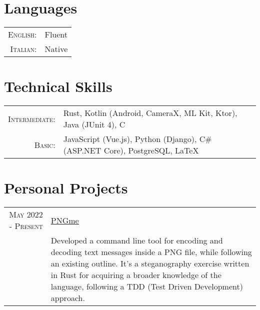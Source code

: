 \documentclass[a4paper,10pt]{article} %
\begin{document}

\section{Languages}

\begin{tabular}{rl}
\textsc{English:} & Fluent\\
\textsc{Italian:} & Native\\
\end{tabular}


\section{Technical Skills}

\begin{tabular}{rl}
\textsc{Intermediate:} & Rust, Kotlin \footnotesize(Android, CameraX, ML Kit, Ktor)\normalsize, Java \footnotesize(JUnit 4)\normalsize, C\\
\textsc{Basic:} & JavaScript \footnotesize(Vue.js)\normalsize, Python \footnotesize(Django)\normalsize, C\# \footnotesize(ASP.NET Core)\normalsize, PostgreSQL, {\sffamily\LaTeX}\setmainfont[SmallCapsFont=Fontin SmallCaps]{Fontin-Regular}\\
\end{tabular}


\section{Personal Projects}

\begin{tabular}{r|p{10.5cm}}
\textsc{May 2022 - Present} & \href{https://github.com/rdxdkr/my-PNGme}{\underline{PNGme}} \emph{}\\ & \footnotesize{Developed a command line tool for encoding and decoding text messages inside a PNG file, while following an existing outline. It's a steganography exercise written in Rust for acquiring a broader knowledge of the language, following a TDD (Test Driven Development) approach.}
\end{tabular}
\end{document}
